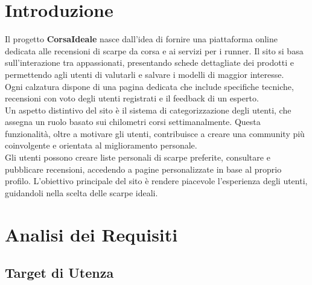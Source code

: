 \documentclass[a4paper, 12pt]{article}
\begin{document}
\newpage
\begin{justify}
    

\section{Introduzione}

Il progetto \textbf{CorsaIdeale} nasce dall'idea di fornire una piattaforma online dedicata alle recensioni di scarpe da corsa e ai servizi per i runner. Il sito si basa sull'interazione tra appassionati, presentando schede dettagliate dei prodotti e permettendo agli utenti di valutarli e salvare i modelli di maggior interesse.\\
Ogni calzatura dispone di una pagina dedicata che include specifiche tecniche, recensioni con voto degli utenti registrati e il feedback di un esperto.\\
Un aspetto distintivo del sito è il sistema di categorizzazione degli utenti, che assegna un ruolo basato sui chilometri corsi settimanalmente. Questa funzionalità, oltre a motivare gli utenti, contribuisce a creare una community più coinvolgente e orientata al miglioramento personale.\\ 
Gli utenti possono creare liste personali di scarpe preferite, consultare e pubblicare recensioni, accedendo a pagine personalizzate in base al proprio profilo. L'obiettivo principale del sito è rendere piacevole l'esperienza degli utenti, guidandoli nella scelta delle scarpe ideali.


\section{Analisi dei Requisiti}

\subsection{Target di Utenza}


\end{justify}
\end{document}
